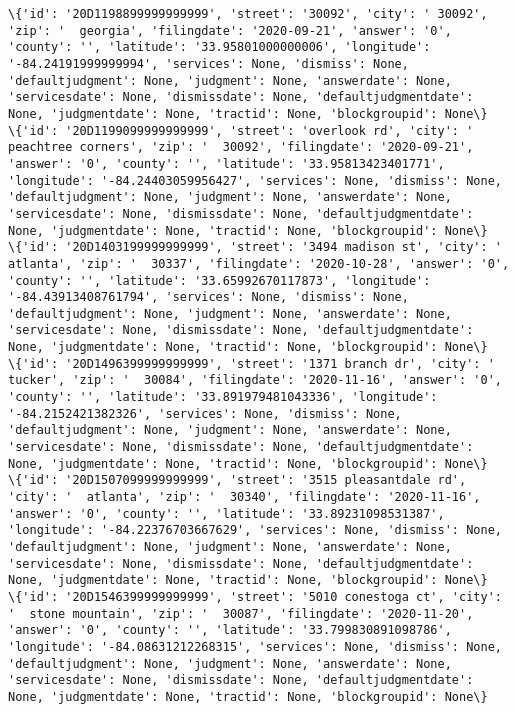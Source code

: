 \documentclass[11pt]{article}
\begin{document}
\begin{Verbatim}[commandchars=\\\{\}]
\{'id': '20D1198899999999999', 'street': '30092', 'city': ' 30092', 'zip': '  georgia', 'filingdate': '2020-09-21', 'answer': '0', 'county': '', 'latitude': '33.95801000000006', 'longitude': '-84.24191999999994', 'services': None, 'dismiss': None, 'defaultjudgment': None, 'judgment': None, 'answerdate': None, 'servicesdate': None, 'dismissdate': None, 'defaultjudgmentdate': None, 'judgmentdate': None, 'tractid': None, 'blockgroupid': None\}
\{'id': '20D1199099999999999', 'street': 'overlook rd', 'city': '  peachtree corners', 'zip': '  30092', 'filingdate': '2020-09-21', 'answer': '0', 'county': '', 'latitude': '33.95813423401771', 'longitude': '-84.24403059956427', 'services': None, 'dismiss': None, 'defaultjudgment': None, 'judgment': None, 'answerdate': None, 'servicesdate': None, 'dismissdate': None, 'defaultjudgmentdate': None, 'judgmentdate': None, 'tractid': None, 'blockgroupid': None\}
\{'id': '20D1403199999999999', 'street': '3494 madison st', 'city': '  atlanta', 'zip': '  30337', 'filingdate': '2020-10-28', 'answer': '0', 'county': '', 'latitude': '33.65992670117873', 'longitude': '-84.43913408761794', 'services': None, 'dismiss': None, 'defaultjudgment': None, 'judgment': None, 'answerdate': None, 'servicesdate': None, 'dismissdate': None, 'defaultjudgmentdate': None, 'judgmentdate': None, 'tractid': None, 'blockgroupid': None\}
\{'id': '20D1496399999999999', 'street': '1371 branch dr', 'city': '  tucker', 'zip': '  30084', 'filingdate': '2020-11-16', 'answer': '0', 'county': '', 'latitude': '33.891979481043336', 'longitude': '-84.2152421382326', 'services': None, 'dismiss': None, 'defaultjudgment': None, 'judgment': None, 'answerdate': None, 'servicesdate': None, 'dismissdate': None, 'defaultjudgmentdate': None, 'judgmentdate': None, 'tractid': None, 'blockgroupid': None\}
\{'id': '20D1507099999999999', 'street': '3515 pleasantdale rd', 'city': '  atlanta', 'zip': '  30340', 'filingdate': '2020-11-16', 'answer': '0', 'county': '', 'latitude': '33.89231098531387', 'longitude': '-84.22376703667629', 'services': None, 'dismiss': None, 'defaultjudgment': None, 'judgment': None, 'answerdate': None, 'servicesdate': None, 'dismissdate': None, 'defaultjudgmentdate': None, 'judgmentdate': None, 'tractid': None, 'blockgroupid': None\}
\{'id': '20D1546399999999999', 'street': '5010 conestoga ct', 'city': '  stone mountain', 'zip': '  30087', 'filingdate': '2020-11-20', 'answer': '0', 'county': '', 'latitude': '33.799830891098786', 'longitude': '-84.08631212268315', 'services': None, 'dismiss': None, 'defaultjudgment': None, 'judgment': None, 'answerdate': None, 'servicesdate': None, 'dismissdate': None, 'defaultjudgmentdate': None, 'judgmentdate': None, 'tractid': None, 'blockgroupid': None\}

\end{Verbatim}
\end{document}
